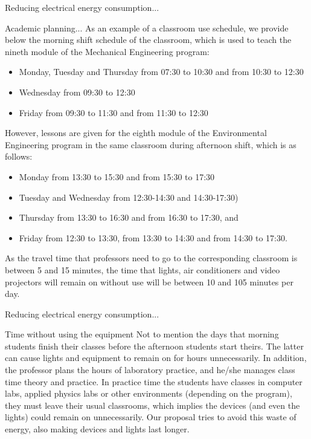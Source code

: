 \documentclass[notes=show, 10pt]{beamer}
\begin{document}
    \begin{frame}{Reducing electrical energy consumption...}
        \begin{block}{Academic planning...}
            As an example of a classroom use schedule, we provide below the morning shift schedule of the classroom, which is used to teach the nineth module of the Mechanical Engineering program:
            \begin{itemize}
                \item Monday, Tuesday and Thursday from 07:30 to 10:30 and from 10:30 to 12:30
                \item Wednesday from 09:30 to 12:30
                \item Friday from 09:30 to 11:30 and from 11:30 to 12:30
            \end{itemize}
            However, lessons are given for the eighth module of the Environmental Engineering program in the same classroom during afternoon shift, which is as follows:
            \begin{itemize}
                \item Monday from 13:30 to 15:30 and from 15:30 to 17:30
                \item Tuesday and Wednesday from 12:30-14:30 and 14:30-17:30)
                \item Thursday from 13:30 to 16:30 and from 16:30 to 17:30, and
                \item Friday from 12:30 to 13:30, from 13:30 to 14:30 and from 14:30 to 17:30.
            \end{itemize}
            As the travel time that professors need to go to the corresponding classroom is between 5 and 15 minutes, the time that lights, air conditioners and video projectors will remain on without use will be between 10 and 105 minutes per day.        
        \end{block}
    \end{frame}
    \begin{frame}{Reducing electrical energy consumption...}
        \begin{block}{Time without using the equipment}
            Not to mention the days that morning students finish their classes before the afternoon students start theirs. The latter can cause lights and equipment to remain on for hours unnecessarily. In addition, the professor plans the hours of laboratory practice, and he/she manages class time theory and practice. In practice time the students have classes in computer labs, applied physics labs or other environments (depending on the program), they must leave their usual classrooms, which implies the devices (and even the lights) could remain on unnecessarily. Our proposal tries to avoid this waste of energy, also making devices and lights last longer.
        \end{block}
    \end{frame}
\end{document}
